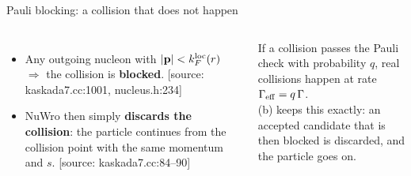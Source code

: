 \documentclass[10pt,aspectratio=169]{beamer}
\newcommand{\G}{\Gamma}
\newcommand{\tagsrc}[1]{{\scriptsize\color{aBlue}[source: #1]}}
\begin{document}
\begin{frame}{Pauli blocking: a collision that does not happen}
\small
\begin{columns}[c]
\centering
{}
\begin{itemize}
\item Any outgoing nucleon with $|\mathbf p|<k_F^{\rm loc}(r)$ $\Rightarrow$ the collision is \textbf{blocked}. \tagsrc{kaskada7.cc:1001, nucleus.h:234}
\item NuWro then simply \textbf{discards the collision}: the particle continues from the collision point with the same momentum and $s$. \tagsrc{kaskada7.cc:84--90}
\end{itemize}
\begin{derivbox}
If a collision passes the Pauli check with probability $q$, real collisions happen at rate $\G_{\rm eff}=q\,\G$.\\
(b) keeps this exactly: an accepted candidate that is then blocked is discarded, and the particle goes on.
\end{derivbox}
\end{columns}
\end{frame}
\end{document}
